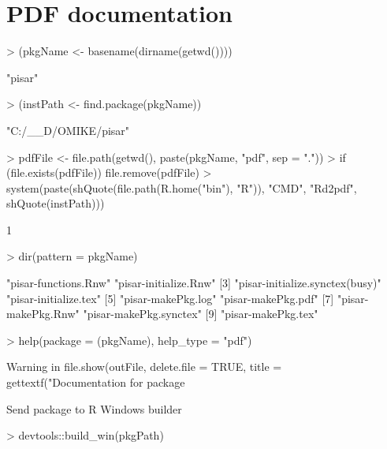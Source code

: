\documentclass[a4paper,12pt]{article}\usepackage[]{graphicx}\usepackage[]{color}
\begin{document}
\section{PDF documentation}

\begin{Schunk}
\begin{Sinput}
> (pkgName <- basename(dirname(getwd())))
\end{Sinput}
\begin{Soutput}
[1] "pisar"
\end{Soutput}
\begin{Sinput}
> (instPath <- find.package(pkgName))
\end{Sinput}
\begin{Soutput}
[1] "C:/__D/OMIKE/pisar"
\end{Soutput}
\begin{Sinput}
> pdfFile <- file.path(getwd(), paste(pkgName, "pdf", sep = "."))
> if (file.exists(pdfFile)) file.remove(pdfFile)
> system(paste(shQuote(file.path(R.home("bin"), "R")), "CMD", "Rd2pdf", shQuote(instPath)))
\end{Sinput}
\begin{Soutput}
[1] 1
\end{Soutput}
\begin{Sinput}
> dir(pattern = pkgName)
\end{Sinput}
\begin{Soutput}
[1] "pisar-functions.Rnw"            "pisar-initialize.Rnw"          
[3] "pisar-initialize.synctex(busy)" "pisar-initialize.tex"          
[5] "pisar-makePkg.log"              "pisar-makePkg.pdf"             
[7] "pisar-makePkg.Rnw"              "pisar-makePkg.synctex"         
[9] "pisar-makePkg.tex"             
\end{Soutput}
\end{Schunk}

\begin{Schunk}
\begin{Sinput}
> help(package = (pkgName), help_type = "pdf")
\end{Sinput}
\begin{Soutput}
Warning in file.show(outFile, delete.file = TRUE, title = gettextf("Documentation for package %s", : '"C:\Program Files (x86)\EmEditor\EmEditor.exe"' not found
\end{Soutput}
\end{Schunk}

Send package to R Windows builder

\begin{Schunk}
\begin{Sinput}
> devtools::build_win(pkgPath)
\end{Sinput}
\end{Schunk}
\end{document}

